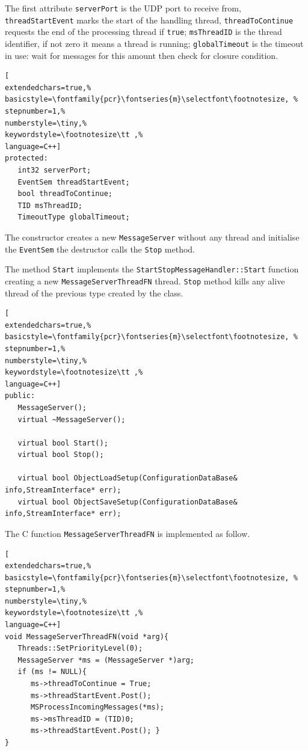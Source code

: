The first attribute \texttt{serverPort} is the UDP port to receive from, \texttt{threadStartEvent} marks the start of the handling thread, \texttt{threadToContinue} requests the end of the processing thread if \texttt{true}; \texttt{msThreadID} is the thread identifier, if not zero it means a thread is running; \texttt{globalTimeout} is the timeout in use: wait for messages for this amount then check for closure condition.
\begin{lstlisting}[
extendedchars=true,%
basicstyle=\fontfamily{pcr}\fontseries{m}\selectfont\footnotesize, %
stepnumber=1,%
numberstyle=\tiny,%
keywordstyle=\footnotesize\tt ,%
language=C++]
protected:
   int32 serverPort;
   EventSem threadStartEvent;
   bool threadToContinue;
   TID msThreadID;
   TimeoutType globalTimeout;
\end{lstlisting}

The constructor creates a new \texttt{MessageServer} without any thread and initialise the \texttt{EventSem} the destructor calls the \texttt{Stop} method.

The method \texttt{Start} implements the \texttt{StartStopMessageHandler::Start} function creating a new \texttt{MessageServerThreadFN} thread. \texttt{Stop} method kills any alive thread of the previous type created by the class.

\begin{lstlisting}[
extendedchars=true,%
basicstyle=\fontfamily{pcr}\fontseries{m}\selectfont\footnotesize, %
stepnumber=1,%
numberstyle=\tiny,%
keywordstyle=\footnotesize\tt ,%
language=C++]
public:
   MessageServer();
   virtual ~MessageServer();

   virtual bool Start();
   virtual bool Stop();

   virtual bool ObjectLoadSetup(ConfigurationDataBase& info,StreamInterface* err);
   virtual bool ObjectSaveSetup(ConfigurationDataBase& info,StreamInterface* err);
\end{lstlisting}

The C function \texttt{MessageServerThreadFN} is implemented as follow.
\begin{lstlisting}[
extendedchars=true,%
basicstyle=\fontfamily{pcr}\fontseries{m}\selectfont\footnotesize, %
stepnumber=1,%
numberstyle=\tiny,%
keywordstyle=\footnotesize\tt ,%
language=C++]
void MessageServerThreadFN(void *arg){
   Threads::SetPriorityLevel(0);
   MessageServer *ms = (MessageServer *)arg;
   if (ms != NULL){
      ms->threadToContinue = True;
      ms->threadStartEvent.Post();
      MSProcessIncomingMessages(*ms);
      ms->msThreadID = (TID)0;
      ms->threadStartEvent.Post(); }
}
\end{lstlisting}

